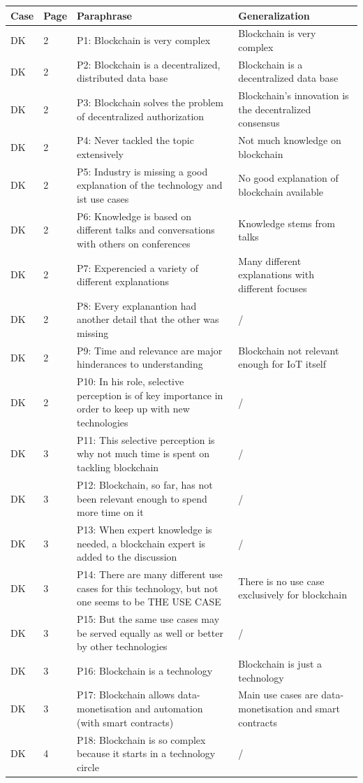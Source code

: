 \label{Anhangteil:DK}
\begin{table}[H]
    \centering
    \begin{tabularx}{\textwidth}{ll|X|p{4cm}}
     Case & Page & Paraphrase & Generalization  \\ \hline
    DK & 2 & P1: Blockchain is very complex & Blockchain is very complex  \\
	DK & 2 & P2: Blockchain is a decentralized, distributed data base & Blockchain is a decentralized data base \\
	DK & 2 & P3: Blockchain solves the problem of decentralized authorization & Blockchain's innovation is the decentralized consensus  \\
	DK & 2 & P4: Never tackled the topic extensively & Not much knowledge on blockchain  \\ 
	DK & 2 & P5: Industry is missing a good explanation of the technology and ist use cases & No good explanation of blockchain available  \\
	DK & 2 & P6: Knowledge is based on different talks and conversations with others on conferences & Knowledge stems from talks  \\
	DK & 2 & P7: Experencied a variety of different explanations & Many different explanations with different focuses   \\
	DK & 2 & P8: Every explanantion had another detail that the other was missing & /  \\
	DK & 2 & P9: Time and relevance are major hinderances to understanding & Blockchain not relevant enough for IoT itself  \\
	DK & 2 & P10: In his role, selective perception is of key importance in order to keep up with new technologies & /  \\
	DK & 3 & P11: This selective perception is why not much time is spent on tackling blockchain & /  \\
	DK & 3 & P12: Blockchain, so far, has not been relevant enough to spend more time on it & /  \\
	DK & 3 & P13: When expert knowledge is needed, a blockchain expert is added to the discussion & /  \\
	DK & 3 & P14: There are many different use cases for this technology, but not one seems to be THE USE CASE & There is no use case exclusively for blockchain  \\
	DK & 3 & P15: But the same use cases may be served equally as well or better by other technologies & /   \\
	DK & 3 & P16: Blockchain is a technology & Blockchain is just a technology \\
	DK & 3 & P17: Blockchain allows data-monetisation and automation (with smart contracts) & Main use cases are data-monetisation and smart contracts \\
	DK & 4 & P18: Blockchain is so complex because it starts in a technology circle & / \\
    \end{tabularx}
\end{table}

